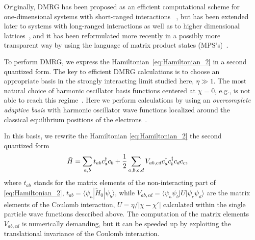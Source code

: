 \documentclass[aps, prb, floatfix, twocolumn, notitlepage, superscriptaddress, 10pt]{revtex4-2}
\newcommand{\n}{N}
\newcommand{\ket}[1]{|#1\rangle}
\newcommand{\1}{{1\hspace*{-0.5ex} \textrm{l} \hspace*{0.5ex}}}
\begin{document}
Originally, DMRG has been proposed as an efficient computational scheme 
for one-dimensional systems with short-ranged  interactions ~\cite{White.1992}, but
has  been extended later to systems with long-ranged interactions as well as to 
higher dimensional  lattices~\cite{Schollwock.2005}, and it has been 
reformulated more recently in a possibly more transparent way by using the language of 
matrix product states (MPS's)~\cite{SCHOLLWOCK201196,mcculloch2007density}. 

To perform  DMRG, we  express the Hamiltonian~\eqref{eq:Hamiltonian_2}  in a second quantized form. 
The key to efficient DMRG calculations   is to choose an appropriate basis in the strongly interacting limit studied here, 
$\eta \gg 1$.  The most natural choice of  harmonic oscillator basis functions centered at $\chi=0$, e.g., 
 is not able to reach this regime~\cite{RontaniPRB2010}. Here we perform calculations by using 
 an \emph{overcomplete adaptive basis}  with harmonic oscillator wave functions localized around the classical equilibrium 
 positions of the electrons~\cite{Shapir.2019}. 

%
%


In this basis, we  rewrite the Hamiltonian \eqref{eq:Hamiltonian_2} the second quantized form 
\begin{gather}
	\tilde H = \sum_{a,b} t_{ab} c^\dagger_a c_b + {1 \over 2} \sum_{a,b,c,d} V_{ab,cd} c^\dagger_a c^\dagger_b c_d c_c,
\end{gather}
where $t_{ab}$ stands for  the matrix elements of the non-interacting part of  \eqref{eq:Hamiltonian_2},
$t_{ab} = \langle \psi_a | \tilde H_0 | \psi_b \rangle$, while  $V_{ab,cd} = \langle \psi_a \psi_b | U | \psi_c \psi_d \rangle$ 
are  the matrix elements of the Coulomb interaction, $U=\eta/|\chi-\chi'|$ calculated within  
the single particle wave functions described above. The computation of   the matrix elements $V_{ab,cd}$ is numerically  demanding, but it can be speeded up 
by exploiting the  translational invariance of the Coulomb interaction.
\end{document}
